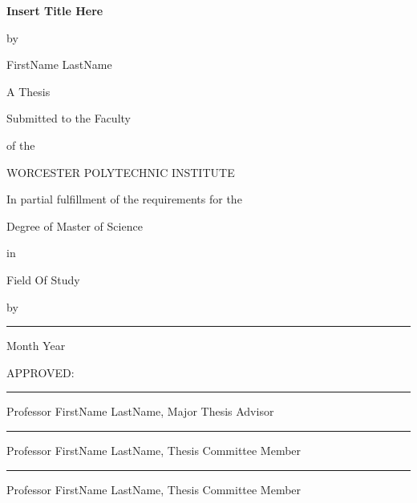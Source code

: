 \begin{titlepage}
\thispagestyle{empty}
\begin{center}
\vspace*{0.18in}

   {\large
	\textbf{
	Insert Title Here
	}
   }

\vspace*{0.18in}
by

\vspace*{0.18in}
FirstName LastName

\vspace*{0.18in}
A Thesis

\vspace*{0.18in}
Submitted to the Faculty

\vspace*{0.18in}
of the

\vspace*{0.18in}
WORCESTER POLYTECHNIC INSTITUTE

\vspace*{0.18in}
In partial fulfillment of the requirements for the

\vspace*{0.18in}
Degree of Master of Science

\vspace*{0.18in}
in

\vspace*{0.18in}
Field Of Study

\vspace*{0.18in}
by

\vspace*{0.18in}\vspace*{0.18in}
\rule{3in}{1.2pt}

\vspace*{0.18in}
Month Year
\end{center}
APPROVED:

\vspace{0.25in}
\rule{3in}{0.8pt}

Professor FirstName LastName, Major Thesis Advisor

\vspace{0.25in}
\rule{3in}{0.8pt}

Professor FirstName LastName, Thesis Committee Member

\vspace{0.25in}
\rule{3in}{0.8pt}

Professor FirstName LastName, Thesis Committee Member
\end{titlepage}
